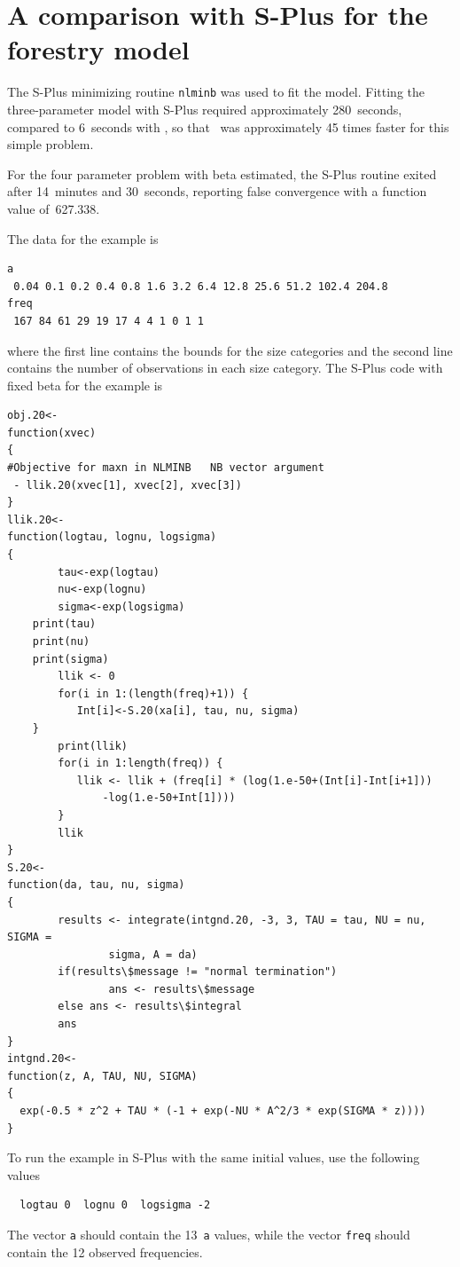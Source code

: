 \documentclass{admbmanual}
\begin{document}
\section{A comparison with S-Plus for the forestry model}

The S-Plus minimizing routine \texttt{nlminb} was used to fit the model. Fitting
the three-parameter model with S-Plus required approximately 280~seconds,
compared to 6~seconds with \ADM, so that \ADM\ was approximately 45 times faster
for this simple problem.

For the four parameter problem with beta estimated, the S-Plus routine exited
after 14~minutes and 30~seconds, reporting false convergence with a function
value of~627.338.

The data for the example is
\begin{lstlisting}
a
 0.04 0.1 0.2 0.4 0.8 1.6 3.2 6.4 12.8 25.6 51.2 102.4 204.8
freq
 167 84 61 29 19 17 4 4 1 0 1 1
\end{lstlisting}
where the first line contains the bounds for the size categories and the second
line contains the number of observations in each size category. The S-Plus code
with fixed beta for the example is
\begin{lstlisting}
obj.20<-
function(xvec)
{
#Objective for maxn in NLMINB   NB vector argument
 - llik.20(xvec[1], xvec[2], xvec[3])
}
llik.20<-
function(logtau, lognu, logsigma)
{
        tau<-exp(logtau)
        nu<-exp(lognu)
        sigma<-exp(logsigma)
	print(tau)
	print(nu)
	print(sigma)
        llik <- 0
        for(i in 1:(length(freq)+1)) {
           Int[i]<-S.20(xa[i], tau, nu, sigma)
	}
        print(llik)
        for(i in 1:length(freq)) {
           llik <- llik + (freq[i] * (log(1.e-50+(Int[i]-Int[i+1]))
               -log(1.e-50+Int[1])))
        }
        llik
}
S.20<-
function(da, tau, nu, sigma)
{
        results <- integrate(intgnd.20, -3, 3, TAU = tau, NU = nu, SIGMA =
                sigma, A = da)
        if(results\$message != "normal termination")
                ans <- results\$message
        else ans <- results\$integral
        ans
}
intgnd.20<-
function(z, A, TAU, NU, SIGMA)
{
  exp(-0.5 * z^2 + TAU * (-1 + exp(-NU * A^2/3 * exp(SIGMA * z))))
}
\end{lstlisting}
To run the example in S-Plus with the same initial values, use the following
values
\begin{lstlisting}
  logtau 0  lognu 0  logsigma -2
\end{lstlisting}
The vector \texttt{a} should contain the 13~\texttt{a} values, while the vector
\texttt{freq} should contain the 12 observed frequencies.
\end{document}
